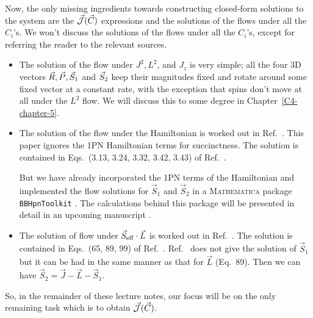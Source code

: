 Now, the only missing ingredients towards constructing closed-form solutions
to the system are the $\vec{\mathcal{J}}(\vec{C})$ expressions and
the solutions of the flows under all the $C_i$'s.
We won't discuss the solutions of the flows under all the $C_i$'s, 
except for referring the reader to the relevant sources.
\begin{itemize}
\item The solution of the flow under $J^2, L^2$, and $J_z$ is very simple;
all the four 3D vectors 
$\vec{R}, \vec{P}, \vec{S}_1$ and $\vec{S}_2$ 
keep their magnitudes fixed and 
rotate around some fixed vector at a constant rate, with the exception that
spins don't move at all under the $L^2$ flow. We will discuss this 
to some degree in Chapter~\ref{C4-chapter-5}.
\item The solution of the flow under the Hamiltonian is worked out in 
Ref.~\cite{Cho:2019brd}. This paper ignores the 1PN Hamiltonian terms
for succinctness.
The solution is contained in Eqs.~(3.13, 3.24, 3.32, 3.42, 3.43)
of Ref.~\cite{Cho:2019brd}.

But we have already incorporated the 1PN terms of the Hamiltonian and implemented the flow solutions for $\vec{S}_1$ and $\vec{S}_2$ in a \textsc{Mathematica} package \texttt{BBHpnToolkit} \cite{MMA1}.
 The calculations behind this package will be presented in 
detail in an upcoming manuscript \cite{next_paper}.



\item The solution of flow under $\vec{S}_{\text{eff}}\cdot \vec{L}$ is worked out in 
Ref.~\cite{tanay2021action}.
The solution is contained in Eqs.~(65, 89, 99)
of Ref.~\cite{tanay2021action}. Ref.~\cite{tanay2021action}
 does not give the solution
of $\vec{S}_1$ but it can be had in the 
same manner as that for $\vec{L}$ (Eq.~89).
Then we can have $\vec{S}_2 = \vec{J} - \vec{L} -\vec{S}_1$.
\end{itemize}
So, in the remainder of these lecture notes, our focus will be on the only
remaining task which is to obtain $\vec{\mathcal{J}}(\vec{C})$.







